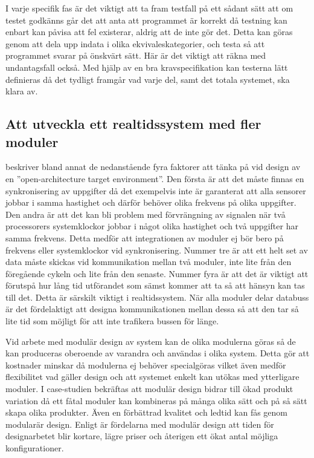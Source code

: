 \documentclass[11pt]{article}
\begin{document}
\begin{flushleft}
I varje specifik fas är det viktigt att ta fram testfall på ett sådant sätt att om testet godkänns går det att anta att programmet är korrekt då testning kan enbart kan påvisa att fel existerar, aldrig att de inte gör det. Detta kan göras genom att dela upp indata i olika ekvivaleskategorier, och testa så att programmet svarar på önskvärt sätt. Här är det viktigt att räkna med undantagsfall också.\cite{tester} Med hjälp av en bra kravspecifikation kan testerna lätt definieras då det tydligt framgår vad varje del, samt det totala systemet, ska klara av. 

\subsection{Att utveckla ett realtidssystem med fler moduler}

\cite{IRS} beskriver bland annat de nedanstående fyra faktorer att tänka på vid design av en ''open-architecture target environment''. Den första är att det måste finnas en synkronisering av uppgifter då det exempelvis inte är garanterat att alla sensorer jobbar i samma hastighet och därför behöver olika frekvens på olika uppgifter. Den andra är att det kan bli problem med förvrängning av signalen när två processorers systemklockor jobbar i något olika hastighet och två uppgifter har samma frekvens. Detta medför att integrationen av moduler ej bör bero på frekvens eller systemklockor vid synkronisering. Nummer tre är att ett helt set av data måste skickas vid kommunikation mellan två moduler, inte lite från den föregående cykeln och lite från den senaste. Nummer fyra är att det är viktigt att förutspå hur lång tid utförandet som sämst kommer att ta så att hänsyn kan tas till det. Detta är särskilt viktigt i realtidssystem. När alla moduler delar databuss är det fördelaktigt att designa kommunikationen mellan dessa så att den tar så lite tid som möjligt för att inte trafikera bussen för länge.   

Vid arbete med modulär design av system kan de olika modulerna göras så de kan produceras oberoende av varandra och användas i olika system. Detta gör att kostnader minskar då modulerna ej behöver specialgöras vilket även medför flexibilitet vad gäller design och att systemet enkelt kan utökas med ytterligare moduler.\cite{ReMoRo} I case-studien \cite{MMPD} bekräftas att modulär design bidrar till ökad produkt variation då ett fåtal moduler kan kombineras på många olika sätt och på så sätt skapa olika produkter. Även en förbättrad kvalitet och ledtid kan fås genom modularär design. Enligt \cite{MRDCRD} är fördelarna med modulär design att tiden för designarbetet blir kortare, lägre priser och återigen ett ökat antal möjliga konfigurationer. 


\end{flushleft}
\end{document}
